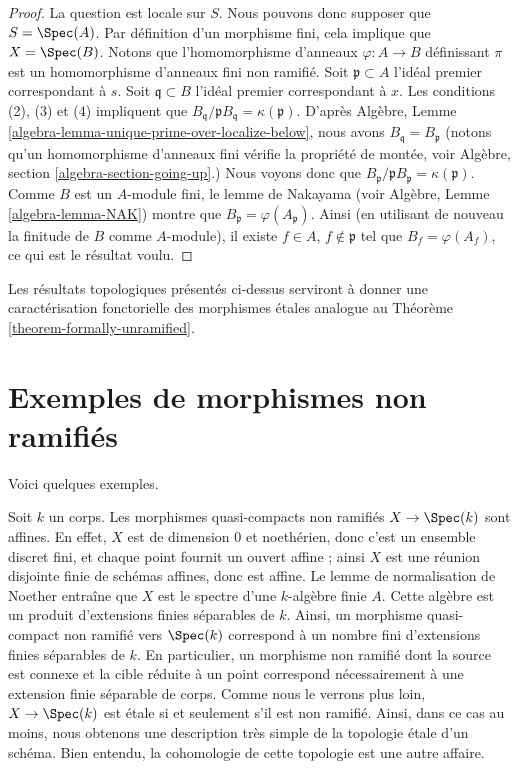\begin{proof}
La question est locale sur $S$. Nous pouvons donc supposer que $S = \Spec(A)$.
Par définition d'un morphisme fini, cela implique que $X = \Spec(B)$.
Notons que l'homomorphisme d'anneaux $\varphi : A \to B$ définissant $\pi$
est un homomorphisme d'anneaux fini non ramifié.
Soit $\mathfrak p \subset A$ l'idéal premier correspondant à $s$.
Soit $\mathfrak q \subset B$ l'idéal premier correspondant à $x$.
Les conditions (2), (3) et (4) impliquent que
$B_{\mathfrak q}/\mathfrak pB_{\mathfrak q} = \kappa(\mathfrak p)$.
D'après Algèbre, Lemme \ref{algebra-lemma-unique-prime-over-localize-below},
nous avons $B_{\mathfrak q} = B_{\mathfrak p}$
(notons qu'un homomorphisme d'anneaux fini vérifie la propriété de montée, voir
Algèbre, section \ref{algebra-section-going-up}.)
Nous voyons donc que
$B_{\mathfrak p}/\mathfrak pB_{\mathfrak p} = \kappa(\mathfrak p)$.
Comme $B$ est un $A$-module fini, le lemme de Nakayama (voir
Algèbre, Lemme \ref{algebra-lemma-NAK})
montre que $B_{\mathfrak p} = \varphi(A_{\mathfrak p})$. Ainsi (en utilisant de
nouveau la finitude de $B$ comme $A$-module), il existe
$f \in A$, $f \not \in \mathfrak p$ tel que $B_f = \varphi(A_f)$,
ce qui est le résultat voulu.
\end{proof}

\noindent
Les résultats topologiques présentés ci-dessus serviront à donner une
caractérisation fonctorielle des morphismes \'etales analogue au Théorème
\ref{theorem-formally-unramified}.




\section{Exemples de morphismes non ramifiés}
\label{section-examples}

\noindent
Voici quelques exemples.

\begin{example}
\label{example-etale-field-extensions}
Soit $k$ un corps.
Les morphismes quasi-compacts non ramifiés $X \to \Spec(k)$ sont affines.
En effet, $X$ est de dimension $0$ et noethérien,
donc c'est un ensemble discret fini, et chaque point fournit un ouvert affine ;
ainsi $X$ est une réunion disjointe finie de schémas affines, donc est affine.
Le lemme de normalisation de Noether entraîne que $X$ est le spectre d'une
$k$-algèbre finie $A$.
Cette algèbre est un produit d'extensions finies séparables de $k$.
Ainsi, un morphisme quasi-compact non ramifié vers $\Spec(k)$
correspond à un nombre fini d'extensions finies séparables de $k$.
En particulier, un morphisme non ramifié dont la source est connexe et la cible
réduite à un point correspond nécessairement à une extension finie séparable de corps.
Comme nous le verrons plus loin, $X \to \Spec(k)$ est \'etale si et
seulement s'il est non ramifié. Ainsi, dans ce cas au moins, nous obtenons une
description très simple de la topologie \'etale d'un schéma. Bien entendu, la
cohomologie de cette topologie est une autre affaire.
\end{example}

